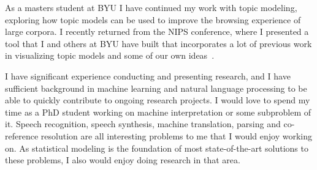 \documentclass[onecolumn, 12pt]{article}
\begin{document}
As a masters student at BYU I have continued my work with topic modeling,
exploring how topic models can be used to improve the browsing experience of
large corpora.  I recently returned from the NIPS conference, where I presented
a tool that I and others at BYU have built that incorporates a lot of previous
work in visualizing topic models and some of our own
ideas~\cite{gardner-2010-topic-browser}.

I have significant experience conducting and presenting research, and I have
sufficient background in machine learning and natural language processing to be
able to quickly contribute to ongoing research projects.  I would love to spend
my time as a PhD student working on machine interpretation or some subproblem
of it.  Speech recognition, speech synthesis, machine translation, parsing and
co-reference resolution are all interesting problems to me that I would enjoy
working on.  As statistical modeling is the foundation of most state-of-the-art
solutions to these problems, I also would enjoy doing research in that area.

\vspace{2mm}
\footnotesize

\renewcommand\bibsection{\noindent \small\textbf{Publications}\vspace{-2mm}\footnotesize}

\end{document}

